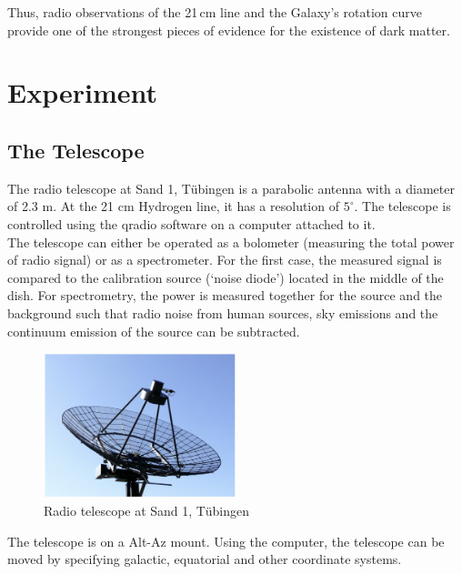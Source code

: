 \documentclass[12pt,a4paper]{article}
\begin{document}
Thus, radio observations of the 21\,cm line and the Galaxy’s rotation curve provide one of the strongest pieces of evidence for the existence of dark matter.


\section{Experiment}
    \subsection{The Telescope}
        The radio telescope at Sand 1, Tübingen is a parabolic antenna with a diameter of 2.3 m. At the 21 cm Hydrogen line, it has a
        resolution of $5^\circ$. The telescope is controlled using the qradio software on a computer attached to it. \\
        The telescope can either be operated as a bolometer (measuring the total power of radio signal) or as a spectrometer. For the first case,
        the measured signal is compared to the calibration source (`noise diode') located in the middle of the dish. For spectrometry, the power is measured 
        together for the source and the background such that radio noise from human sources, sky emissions and the continuum emission of the source can be subtracted.

        \begin{figure}[H]
            \centering
            \includegraphics[width=0.5\textwidth]{telescope.png}
            \caption{Radio telescope at Sand 1, Tübingen}
            \label{fig:telescope}
        \end{figure}

        The telescope is on a Alt-Az mount. Using the computer, the telescope can be moved by specifying galactic, equatorial and other coordinate systems.
\end{document}
